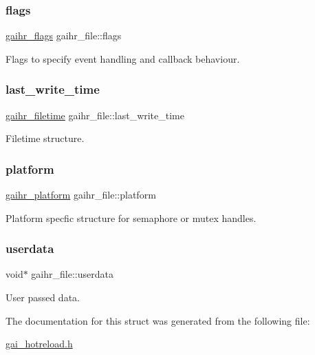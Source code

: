 \subsubsection{\texorpdfstring{flags}{flags}}
{\footnotesize\ttfamily \hyperlink{gai__hotreload_8h_aaebb069b6896f065efd75640e0e4150b}{gaihr\+\_\+flags} gaihr\+\_\+file\+::flags}

Flags to specify event handling and callback behaviour. \mbox{\label{structgaihr__file_a38b2bc43116a1fd59715ca1714d80462}} 
\subsubsection{\texorpdfstring{last\+\_\+write\+\_\+time}{last\_write\_time}}
{\footnotesize\ttfamily \hyperlink{uniongaihr__filetime}{gaihr\+\_\+filetime} gaihr\+\_\+file\+::last\+\_\+write\+\_\+time}

Filetime structure. \mbox{\label{structgaihr__file_a138044c270d5f0e83917ae2841efe8b7}} 
\subsubsection{\texorpdfstring{platform}{platform}}
{\footnotesize\ttfamily \hyperlink{uniongaihr__platform}{gaihr\+\_\+platform} gaihr\+\_\+file\+::platform}

Platform specfic structure for semaphore or mutex handles. \mbox{\label{structgaihr__file_a06bf963cb9c08e69fcc6c4bb3140a2b8}} 
\subsubsection{\texorpdfstring{userdata}{userdata}}
{\footnotesize\ttfamily void$\ast$ gaihr\+\_\+file\+::userdata}

User passed data. 

The documentation for this struct was generated from the following file\+:\begin{DoxyCompactItemize}
\item 
\hyperlink{gai__hotreload_8h}{gai\+\_\+hotreload.\+h}\end{DoxyCompactItemize}
